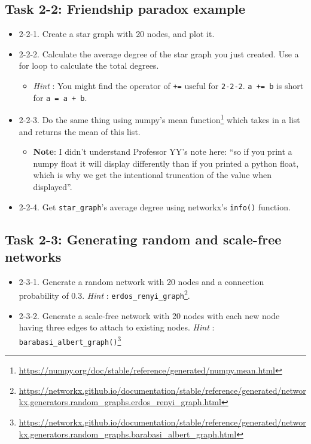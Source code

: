 \documentclass[
]{krantz}
\providecommand{\tightlist}{%
  \setlength{\itemsep}{0pt}\setlength{\parskip}{0pt}}
\renewcommand{\href}[2]{#2\footnote{\url{#1}}}
\begin{document}
\hypertarget{task-2-2-friendship-paradox-example}{%
\subsection{Task 2-2: Friendship paradox example}\label{task-2-2-friendship-paradox-example}}

\begin{itemize}
\item
  2-2-1. Create a star graph with 20 nodes, and plot it.
\item
  2-2-2. Calculate the average degree of the star graph you just created. Use a for loop to calculate the total degrees.

  \begin{itemize}
  \tightlist
  \item
    \emph{Hint} : You might find the operator of \texttt{+=} useful for \texttt{2-2-2}. \texttt{a\ +=\ b} is short for \texttt{a\ =\ a\ +\ b}.
  \end{itemize}
\item
  2-2-3. Do the same thing using \href{https://numpy.org/doc/stable/reference/generated/numpy.mean.html}{numpy's mean function} which takes in a list and returns the mean of this list.

  \begin{itemize}
  \tightlist
  \item
    \textbf{Note}: I didn't understand Professor YY's note here: ``so if you print a numpy float it will display differently than if you printed a python float, which is why we get the intentional truncation of the value when displayed''.
  \end{itemize}
\item
  2-2-4. Get \texttt{star\_graph}'s average degree using networkx's \texttt{info()} function.
\end{itemize}

\hypertarget{task-2-3-generating-random-and-scale-free-networks}{%
\subsection{Task 2-3: Generating random and scale-free networks}\label{task-2-3-generating-random-and-scale-free-networks}}

\begin{itemize}
\item
  2-3-1. Generate a random network with 20 nodes and a connection probability of 0.3. \emph{Hint} : \href{https://networkx.github.io/documentation/stable/reference/generated/networkx.generators.random_graphs.erdos_renyi_graph.html}{\texttt{erdos\_renyi\_graph}}.
\item
  2-3-2. Generate a scale-free network with 20 nodes with each new node having three edges to attach to existing nodes. \emph{Hint} : \href{https://networkx.github.io/documentation/stable/reference/generated/networkx.generators.random_graphs.barabasi_albert_graph.html}{\texttt{barabasi\_albert\_graph()}}
\end{itemize}
\end{document}
